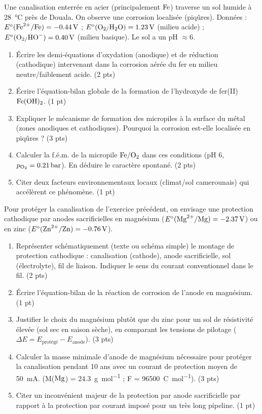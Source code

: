\documentclass[11pt]{article}
\begin{document}
\begin{exercice}
Une canalisation enterrée en acier (principalement $\ce{Fe}$) traverse un sol humide à \SI{28}{\celsius} près de Douala. On observe une corrosion localisée (piqûres). Données : $E^\circ(\ce{Fe^{2+}/Fe}) = \SI{-0,44}{V}$ ; $E^\circ(\ce{O2/H2O}) = \SI{+1,23}{V}$ (milieu acide) ; $E^\circ(\ce{O2/HO^{-}}) = \SI{+0,40}{V}$ (milieu basique). Le sol a un pH $\approx 6$.
\begin{enumerate}
    \item Écrire les demi-équations d'oxydation (anodique) et de réduction (cathodique) intervenant dans la corrosion aérée du fer en milieu neutre/faiblement acide. (2 pts)
    \item Écrire l'équation-bilan globale de la formation de l'hydroxyde de fer(II) $\ce{Fe(OH)2}$. (1 pt)
    \item Expliquer le mécanisme de formation des micropiles à la surface du métal (zones anodiques et cathodiques). Pourquoi la corrosion est-elle localisée en piqûres ? (3 pts)
    \item Calculer la f.é.m. de la micropile $\ce{Fe/O2}$ dans ces conditions (pH 6, $p_{\ce{O2}} = \SI{0,21}{bar}$). En déduire le caractère spontané. (2 pts)
    \item Citer deux facteurs environnementaux locaux (climat/sol camerounais) qui accélèrent ce phénomène. (1 pt)
\end{enumerate}
\end{exercice}

\begin{exercice}
Pour protéger la canalisation de l'exercice précédent, on envisage une protection cathodique par anodes sacrificielles en magnésium ($E^\circ(\ce{Mg^{2+}/Mg}) = \SI{-2,37}{V}$) ou en zinc ($E^\circ(\ce{Zn^{2+}/Zn}) = \SI{-0,76}{V}$).
\begin{enumerate}
    \item Représenter schématiquement (texte ou schéma simple) le montage de protection cathodique : canalisation (cathode), anode sacrificielle, sol (électrolyte), fil de liaison. Indiquer le sens du courant conventionnel dans le fil. (2 pts)
    \item Écrire l'équation-bilan de la réaction de corrosion de l'anode en magnésium. (1 pt)
    \item Justifier le choix du magnésium plutôt que du zinc pour un sol de résistivité élevée (sol sec en saison sèche), en comparant les tensions de pilotage ($\Delta E = E_{\text{protégé}} - E_{\text{anode}}$). (3 pts)
    \item Calculer la masse minimale d'anode de magnésium nécessaire pour protéger la canalisation pendant 10 ans avec un courant de protection moyen de \SI{50}{mA}. (M($\ce{Mg}$) = \SI{24,3}{g.mol^{-1}} ; F = \SI{96500}{C.mol^{-1}}). (3 pts)
    \item Citer un inconvénient majeur de la protection par anode sacrificielle par rapport à la protection par courant imposé pour un très long pipeline. (1 pt)
\end{enumerate}
\end{exercice}
\end{document}
